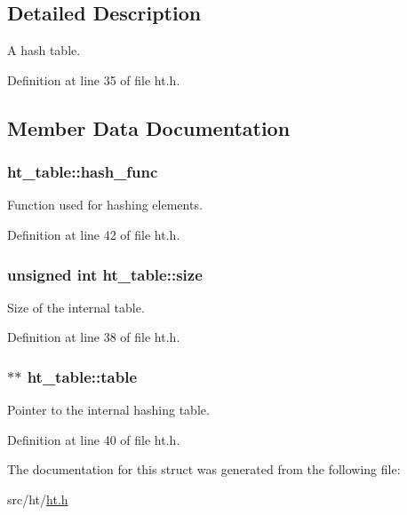 \subsection{Detailed Description}
A hash table. 

Definition at line 35 of file ht.h.



\subsection{Member Data Documentation}
\hypertarget{structht__table_abe53fe8d261dea812255944769d22f45}{
\subsubsection[{hash\_\-func}]{ {\bf ht\_\-table::hash\_\-func}}}
\label{structht__table_abe53fe8d261dea812255944769d22f45}


Function used for hashing elements. 



Definition at line 42 of file ht.h.

\hypertarget{structht__table_a493b0baf20b4274a08b5451e61f8e5f4}{
\subsubsection[{size}]{\setlength{\rightskip}{0pt plus 5cm}unsigned int {\bf ht\_\-table::size}}}
\label{structht__table_a493b0baf20b4274a08b5451e61f8e5f4}


Size of the internal table. 



Definition at line 38 of file ht.h.

\hypertarget{structht__table_ae739f6f0d8b6cd6f55337ae7d0761dfc}{
\subsubsection[{table}]{$\ast$$\ast$ {\bf ht\_\-table::table}}}
\label{structht__table_ae739f6f0d8b6cd6f55337ae7d0761dfc}


Pointer to the internal hashing table. 



Definition at line 40 of file ht.h.



The documentation for this struct was generated from the following file:\begin{DoxyCompactItemize}
\item 
src/ht/\hyperlink{ht_8h}{ht.h}\end{DoxyCompactItemize}
